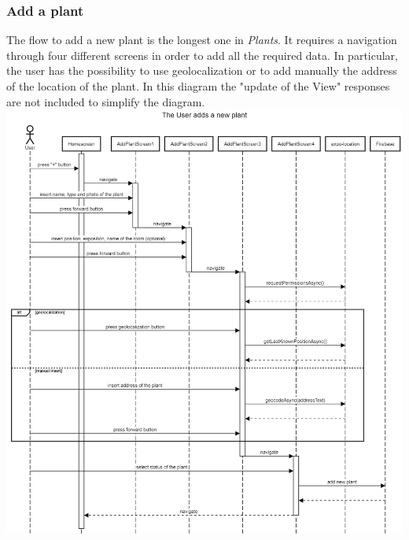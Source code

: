 \documentclass[10pt]{article}
\begin{document}
	\subsubsection{Add a plant}
	The flow to add a new plant is the longest one in \textit{Plants}. It requires a navigation through four different screens in order to add all the required data. In particular, the user has the possibility to use geolocalization or to add manually the address of the location of the plant. In this diagram the "update of the View" responses are not included to simplify the diagram.
	\newline
	\newline
	\newline
	\includegraphics[scale=0.30]{resources/addPlant.png}
	\newpage
\end{document}
